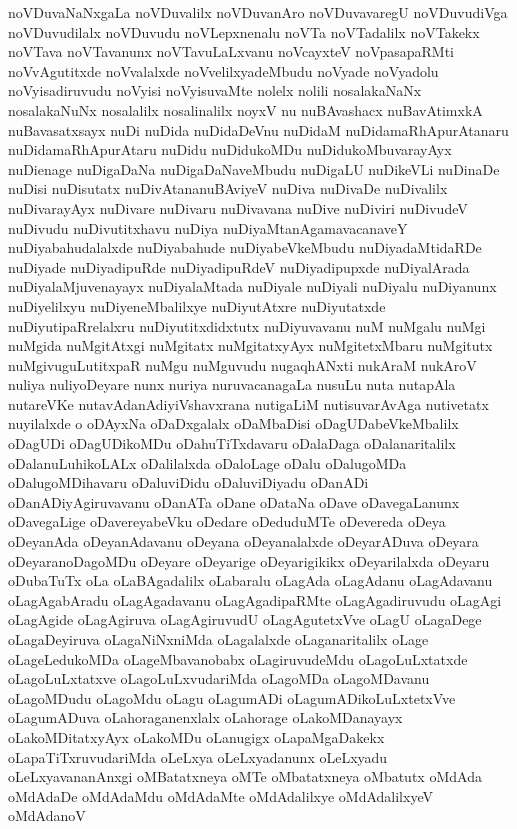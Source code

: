 {noVDuvaNaNxgaLa
noVDuvalilx
noVDuvanAro
noVDuvavaregU
noVDuvudiVga
noVDuvudilalx
noVDuvudu
noVLepxnenalu
noVTa
noVTadalilx
noVTakekx
noVTava
noVTavanunx
noVTavuLaLxvanu
noVcayxteV
noVpasapaRMti
noVvAgutitxde
noVvalalxde
noVvelilxyadeMbudu
noVyade
noVyadolu
noVyisadiruvudu
noVyisi
noVyisuvaMte
nolelx
nolili
nosalakaNaNx
nosalakaNuNx
nosalalilx
nosalinalilx
noyxV
nu
nuBAvashacx
nuBavAtimxkA
nuBavasatxsayx
nuDi
nuDida
nuDidaDeVnu
nuDidaM
nuDidamaRhApurAtanaru
nuDidamaRhApurAtaru
nuDidu
nuDidukoMDu
nuDidukoMbuvarayAyx
nuDienage
nuDigaDaNa
nuDigaDaNaveMbudu
nuDigaLU
nuDikeVLi
nuDinaDe
nuDisi
nuDisutatx
nuDivAtananuBAviyeV
nuDiva
nuDivaDe
nuDivalilx
nuDivarayAyx
nuDivare
nuDivaru
nuDivavana
nuDive
nuDiviri
nuDivudeV
nuDivudu
nuDivutitxhavu
nuDiya
nuDiyaMtanAgamavacanaveY
nuDiyabahudalalxde
nuDiyabahude
nuDiyabeVkeMbudu
nuDiyadaMtidaRDe
nuDiyade
nuDiyadipuRde
nuDiyadipuRdeV
nuDiyadipupxde
nuDiyalArada
nuDiyalaMjuvenayayx
nuDiyalaMtada
nuDiyale
nuDiyali
nuDiyalu
nuDiyanunx
nuDiyelilxyu
nuDiyeneMbalilxye
nuDiyutAtxre
nuDiyutatxde
nuDiyutipaRrelalxru
nuDiyutitxdidxtutx
nuDiyuvavanu
nuM
nuMgalu
nuMgi
nuMgida
nuMgitAtxgi
nuMgitatx
nuMgitatxyAyx
nuMgitetxMbaru
nuMgitutx
nuMgivuguLutitxpaR
nuMgu
nuMguvudu
nugaqhANxti
nukAraM
nukAroV
nuliya
nuliyoDeyare
nunx
nuriya
nuruvacanagaLa
nusuLu
nuta
nutapAla
nutareVKe
nutavAdanAdiyiVshavxrana
nutigaLiM
nutisuvarAvAga
nutivetatx
nuyilalxde
o
oDAyxNa
oDaDxgalalx
oDaMbaDisi
oDagUDabeVkeMbalilx
oDagUDi
oDagUDikoMDu
oDahuTiTxdavaru
oDalaDaga
oDalanaritalilx
oDalanuLuhikoLALx
oDalilalxda
oDaloLage
oDalu
oDalugoMDa
oDalugoMDihavaru
oDaluviDidu
oDaluviDiyadu
oDanADi
oDanADiyAgiruvavanu
oDanATa
oDane
oDataNa
oDave
oDavegaLanunx
oDavegaLige
oDavereyabeVku
oDedare
oDeduduMTe
oDevereda
oDeya
oDeyanAda
oDeyanAdavanu
oDeyana
oDeyanalalxde
oDeyarADuva
oDeyara
oDeyaranoDagoMDu
oDeyare
oDeyarige
oDeyarigikikx
oDeyarilalxda
oDeyaru
oDubaTuTx
oLa
oLaBAgadalilx
oLabaralu
oLagAda
oLagAdanu
oLagAdavanu
oLagAgabAradu
oLagAgadavanu
oLagAgadipaRMte
oLagAgadiruvudu
oLagAgi
oLagAgide
oLagAgiruva
oLagAgiruvudU
oLagAgutetxVve
oLagU
oLagaDege
oLagaDeyiruva
oLagaNiNxniMda
oLagalalxde
oLaganaritalilx
oLage
oLageLedukoMDa
oLageMbavanobabx
oLagiruvudeMdu
oLagoLuLxtatxde
oLagoLuLxtatxve
oLagoLuLxvudariMda
oLagoMDa
oLagoMDavanu
oLagoMDudu
oLagoMdu
oLagu
oLagumADi
oLagumADikoLuLxtetxVve
oLagumADuva
oLahoraganenxlalx
oLahorage
oLakoMDanayayx
oLakoMDitatxyAyx
oLakoMDu
oLanugigx
oLapaMgaDakekx
oLapaTiTxruvudariMda
oLeLxya
oLeLxyadanunx
oLeLxyadu
oLeLxyavananAnxgi
oMBatatxneya
oMTe
oMbatatxneya
oMbatutx
oMdAda
oMdAdaDe
oMdAdaMdu
oMdAdaMte
oMdAdalilxye
oMdAdalilxyeV
oMdAdanoV
}
